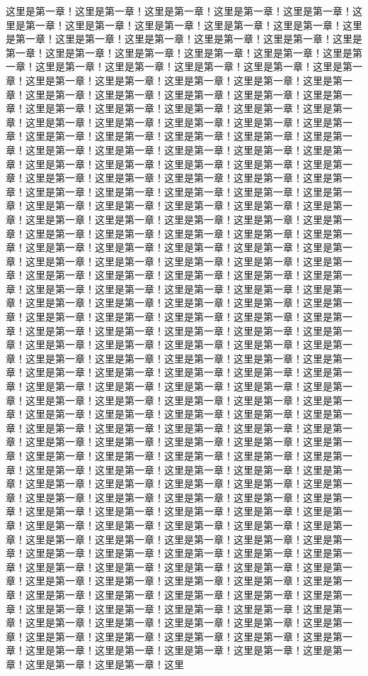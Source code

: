 这里是第一章！这里是第一章！这里是第一章！这里是第一章！这里是第一章！这里是第一章！这里是第一章！这里是第一章！这里是第一章！这里是第一章！这里是第一章！这里是第一章！这里是第一章！这里是第一章！这里是第一章！这里是第一章！这里是第一章！这里是第一章！这里是第一章！这里是第一章！这里是第一章！这里是第一章！这里是第一章！这里是第一章！这里是第一章！这里是第一章！这里是第一章！这里是第一章！这里是第一章！这里是第一章！这里是第一章！这里是第一章！这里是第一章！这里是第一章！这里是第一章！这里是第一章！这里是第一章！这里是第一章！这里是第一章！这里是第一章！这里是第一章！这里是第一章！这里是第一章！这里是第一章！这里是第一章！这里是第一章！这里是第一章！这里是第一章！这里是第一章！这里是第一章！这里是第一章！这里是第一章！这里是第一章！这里是第一章！这里是第一章！这里是第一章！这里是第一章！这里是第一章！这里是第一章！这里是第一章！这里是第一章！这里是第一章！这里是第一章！这里是第一章！这里是第一章！这里是第一章！这里是第一章！这里是第一章！这里是第一章！这里是第一章！这里是第一章！这里是第一章！这里是第一章！这里是第一章！这里是第一章！这里是第一章！这里是第一章！这里是第一章！这里是第一章！这里是第一章！这里是第一章！这里是第一章！这里是第一章！这里是第一章！这里是第一章！这里是第一章！这里是第一章！这里是第一章！这里是第一章！这里是第一章！这里是第一章！这里是第一章！这里是第一章！这里是第一章！这里是第一章！这里是第一章！这里是第一章！这里是第一章！这里是第一章！这里是第一章！这里是第一章！这里是第一章！这里是第一章！这里是第一章！这里是第一章！这里是第一章！这里是第一章！这里是第一章！这里是第一章！这里是第一章！这里是第一章！这里是第一章！这里是第一章！这里是第一章！这里是第一章！这里是第一章！这里是第一章！这里是第一章！这里是第一章！这里是第一章！这里是第一章！这里是第一章！这里是第一章！这里是第一章！这里是第一章！这里是第一章！这里是第一章！这里是第一章！这里是第一章！这里是第一章！这里是第一章！这里是第一章！这里是第一章！这里是第一章！这里是第一章！这里是第一章！这里是第一章！这里是第一章！这里是第一章！这里是第一章！这里是第一章！这里是第一章！这里是第一章！这里是第一章！这里是第一章！这里是第一章！这里是第一章！这里是第一章！这里是第一章！这里是第一章！这里是第一章！这里是第一章！这里是第一章！这里是第一章！这里是第一章！这里是第一章！这里是第一章！这里是第一章！这里是第一章！这里是第一章！这里是第一章！这里是第一章！这里是第一章！这里是第一章！这里是第一章！这里是第一章！这里是第一章！这里是第一章！这里是第一章！这里是第一章！这里是第一章！这里是第一章！这里是第一章！这里是第一章！这里是第一章！这里是第一章！这里是第一章！这里是第一章！这里是第一章！这里是第一章！这里是第一章！这里是第一章！这里是第一章！这里是第一章！这里是第一章！这里是第一章！这里是第一章！这里是第一章！这里是第一章！这里是第一章！这里是第一章！这里是第一章！这里是第一章！这里是第一章！这里是第一章！这里是第一章！这里是第一章！这里是第一章！这里是第一章！这里是第一章！这里是第一章！这里是第一章！这里是第一章！这里是第一章！这里是第一章！这里是第一章！这里是第一章！这里是第一章！这里是第一章！这里是第一章！这里是第一章！这里是第一章！这里是第一章！这里是第一章！这里是第一章！这里是第一章！这里是第一章！这里是第一章！这里是第一章！这里是第一章！这里是第一章！这里是第一章！这里是第一章！这里是第一章！这里是第一章！这里是第一章！这里是第一章！这里是第一章！这里是第一章！这里是第一章！这里是第一章！这里是第一章！这里是第一章！这里是第一章！这里是第一章！这里是第一章！这里是第一章！这里是第一章！这里